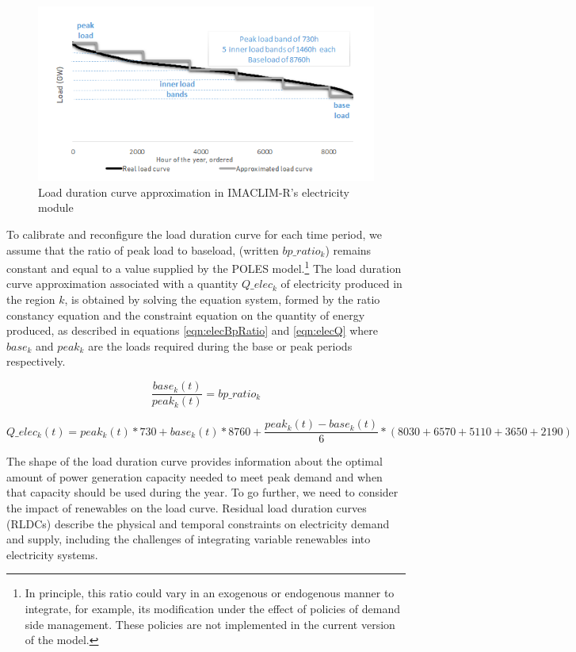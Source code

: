 \begin{figure}
    \includegraphics{figures&tables/LDC.png}
    \caption{Load duration curve approximation in IMACLIM-R's electricity module}
    \centering
    \label{fig:LDC}
\end{figure}


To calibrate and reconfigure the load duration curve for each time period, we assume that the ratio of peak load to baseload, (written $bp\_ratio_k$) remains constant and equal to a value supplied by the POLES model.\footnote{
    In principle, this ratio could vary in an exogenous or endogenous manner to integrate, for example, its modification under the effect of policies of demand side management. These policies are not implemented in the current version of the model.
}
The load duration curve approximation associated with a quantity $Q\_elec_k$ of electricity produced in the region $k$, is obtained by solving the equation system, formed by the ratio constancy equation and the constraint equation on the quantity of energy produced, as described in equations \ref{eqn:elecBpRatio} and  \ref{eqn:elecQ}
where $base_k$ and $peak_k$ are the loads required during the base or peak periods respectively.

\begin{dmath}
    \frac{base_k(t)}{peak_k(t)} = bp\_ratio_k
    \label{eqn:elecBpRatio}
\end{dmath}

\begin{dmath}
    Q\_elec_k(t) =
    peak_k(t) * 730 +
    base_k(t) * 8760 + \frac{peak_k(t) - base_k(t)}{6} * ( 8030 + 6570 + 5110 + 3650 + 2190)
    \label{eqn:elecQ}
\end{dmath}

The shape of the load duration curve provides information about the optimal amount of power generation capacity needed to meet peak demand and when that capacity should be used during the year. To go further, we need to consider the impact of renewables on the load curve. Residual load duration curves (RLDCs) describe the physical and temporal constraints on electricity demand and supply, including the challenges of integrating variable renewables into electricity systems.

